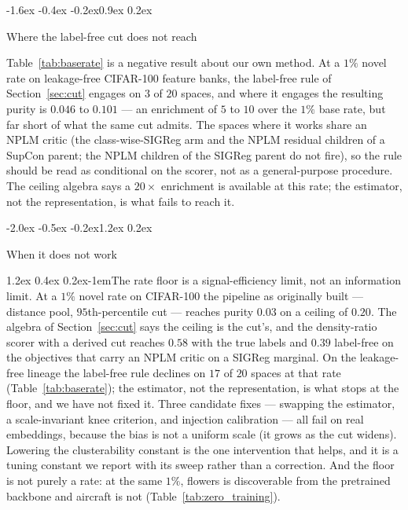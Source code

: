 \documentclass{article}
\makeatletter
\renewcommand\section{\@startsection{section}{1}{\z@}%
  {-2.0ex \@plus -0.5ex \@minus -0.2ex}{1.2ex \@plus 0.2ex}%
  {\large\bf\raggedright}}
\renewcommand\subsection{\@startsection{subsection}{2}{\z@}%
  {-1.6ex \@plus -0.4ex \@minus -0.2ex}{0.9ex \@plus 0.2ex}%
  {\normalsize\bf\raggedright}}
\renewcommand\paragraph{\@startsection{paragraph}{4}{\z@}%
  {1.2ex \@plus 0.4ex \@minus 0.2ex}{-1em}{\normalsize\bf}}
\makeatother
\begin{document}


\subsection{Where the label-free cut does not reach}


Table~\ref{tab:baserate} is a negative result about our own method.
At a $1\%$ novel rate on leakage-free CIFAR-100 feature banks, the label-free rule of
Section~\ref{sec:cut} engages on $3$ of $20$ spaces, and where it engages the
resulting purity is $0.046$ to $0.101$ --- an enrichment of $5$ to $10$ over
the $1\%$ base rate, but far short of what the same cut admits. The spaces
where it works share an NPLM critic (the class-wise-SIGReg arm and the NPLM
residual children of a SupCon parent; the NPLM children of the SIGReg parent
do not fire), so the rule should be read as conditional on the scorer, not as
a general-purpose procedure. The ceiling algebra says a $20\times$ enrichment is available at
this rate; the estimator, not the representation, is what fails to reach it.


\section{When it does not work}
\label{sec:limits}

\paragraph{The rate floor is a signal-efficiency limit, not an
information limit.} At a $1\%$ novel rate on CIFAR-100 the pipeline as
originally built --- distance pool, $95$th-percentile cut --- reaches purity
$0.03$ on a ceiling of $0.20$. The algebra of Section~\ref{sec:cut} says the
ceiling is the cut's, and the density-ratio scorer with a derived cut reaches
$0.58$ with the true labels and $0.39$ label-free on the objectives that
carry an NPLM critic on a SIGReg marginal. On the leakage-free lineage the
label-free rule declines on $17$ of $20$ spaces at that rate
(Table~\ref{tab:baserate}); the estimator, not the representation, is what
stops at the floor, and we have not fixed it. Three candidate fixes ---
swapping the estimator, a scale-invariant knee criterion, and injection
calibration --- all fail on real embeddings, because the bias is not a
uniform scale (it grows as the cut widens). Lowering the clusterability
constant is the one intervention that helps, and it is a tuning constant we
report with its sweep rather than a correction. And the floor is not purely
a rate: at the same $1\%$, flowers is discoverable from the pretrained backbone
and aircraft is not (Table~\ref{tab:zero_training}).
\end{document}
